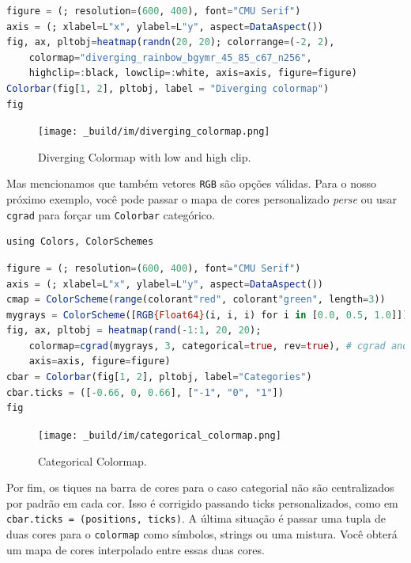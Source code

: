 \documentclass[
  notoc %
]{tufte-book}
\newcommand{\passthrough}[1]{#1}
\begin{document}
\begin{lstlisting}[language=Julia]
figure = (; resolution=(600, 400), font="CMU Serif")
axis = (; xlabel=L"x", ylabel=L"y", aspect=DataAspect())
fig, ax, pltobj=heatmap(randn(20, 20); colorrange=(-2, 2),
    colormap="diverging_rainbow_bgymr_45_85_c67_n256",
    highclip=:black, lowclip=:white, axis=axis, figure=figure)
Colorbar(fig[1, 2], pltobj, label = "Diverging colormap")
fig
\end{lstlisting}

\begin{figure}
\hypertarget{fig:diverging_colormap}{%
\centering
\texttt{[image: \_build/im/diverging\_colormap.png]}
\caption{Diverging Colormap with low and high
clip.}\label{fig:diverging_colormap}
}
\end{figure}

Mas mencionamos que também vetores \passthrough{\lstinline!RGB!} são
opções válidas. Para o nosso próximo exemplo, você pode passar o mapa de
cores personalizado \emph{perse} ou usar \passthrough{\lstinline!cgrad!}
para forçar um \passthrough{\lstinline!Colorbar!} categórico.

\begin{lstlisting}
using Colors, ColorSchemes
\end{lstlisting}

\begin{lstlisting}[language=Julia]
figure = (; resolution=(600, 400), font="CMU Serif")
axis = (; xlabel=L"x", ylabel=L"y", aspect=DataAspect())
cmap = ColorScheme(range(colorant"red", colorant"green", length=3))
mygrays = ColorScheme([RGB{Float64}(i, i, i) for i in [0.0, 0.5, 1.0]])
fig, ax, pltobj = heatmap(rand(-1:1, 20, 20);
    colormap=cgrad(mygrays, 3, categorical=true, rev=true), # cgrad and Symbol, mygrays,
    axis=axis, figure=figure)
cbar = Colorbar(fig[1, 2], pltobj, label="Categories")
cbar.ticks = ([-0.66, 0, 0.66], ["-1", "0", "1"])
fig
\end{lstlisting}

\begin{figure}
\hypertarget{fig:categorical_colormap}{%
\centering
\texttt{[image: \_build/im/categorical\_colormap.png]}
\caption{Categorical Colormap.}\label{fig:categorical_colormap}
}
\end{figure}

Por fim, os tiques na barra de cores para o caso categorial não são
centralizados por padrão em cada cor. Isso é corrigido passando ticks
personalizados, como em
\passthrough{\lstinline!cbar.ticks = (positions, ticks)!}. A última
situação é passar uma tupla de duas cores para o
\passthrough{\lstinline!colormap!} como símbolos, strings ou uma
mistura. Você obterá um mapa de cores interpolado entre essas duas
cores.
\end{document}
